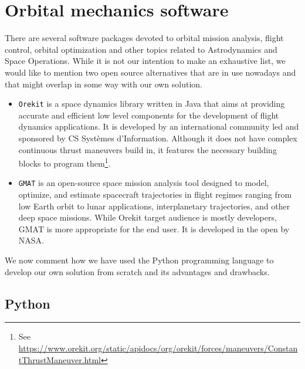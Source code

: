 \section{Orbital mechanics software}
% 
% 
% 
%
%

There are several software packages devoted to orbital mission analysis, flight control, orbital optimization and other topics related to Astrodynamics and Space Operations. While it is not our intention to make an exhaustive list, we would like to mention two open source alternatives that are in use nowadays and that might overlap in some way with our own solution.

\begin{itemize}
\item \verb|Orekit| is a space dynamics library written in Java that aims at providing accurate and efficient low level components for the development of flight dynamics applications. It is developed by an international community led and sponsored by CS Systèmes d'Information. Although it does not have complex continuous thrust maneuvers build in, it features the necessary building blocks to program them\footnote{See \url{https://www.orekit.org/static/apidocs/org/orekit/forces/maneuvers/ConstantThrustManeuver.html}}.
%
\item \verb|GMAT| is an open-source space mission analysis tool designed to model, optimize, and estimate spacecraft trajectories in flight regimes ranging from low Earth orbit to lunar applications, interplanetary trajectories, and other deep space missions. While Orekit target audience is mostly developers, GMAT is more appropriate for the end user. It is developed in the open by NASA.
\end{itemize}

We now comment how we have used the Python programming language to develop our own solution from scratch and its advantages and drawbacks.

\subsection{Python} \label{sec:python}

